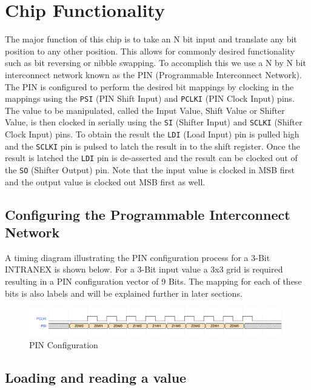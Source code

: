 \documentclass{article}
\begin{document}
\newpage
\section{Chip Functionality}

The major function of this chip is to take an N bit input and translate any bit
position to any other position. This allows for commonly desired functionality
such as bit reversing or nibble swapping. To accomplish this we use a N by N
bit interconnect network known as the PIN (Programmable Interconnect Network).
The PIN is configured to perform the desired bit mappings by clocking in the
mappings using the \texttt{PSI} (PIN Shift Input) and \texttt{PCLKI} (PIN Clock
Input) pins.  The value to be manipulated, called  the Input Value, Shift Value
or Shifter Value, is then clocked in serially using the \texttt{SI} (Shifter
Input) and \texttt{SCLKI} (Shifter Clock Input) pins. To obtain the result the
\texttt{LDI} (Load Input) pin is pulled high and the \texttt{SCLKI} pin is
pulsed to latch the result in to the shift register. Once the result is latched
the \texttt{LDI} pin is de-asserted and the result can be clocked out of the
\texttt{SO} (Shifter Output) pin. Note that the input value is clocked in MSB
first and the output value is clocked out MSB first as well.

\subsection{Configuring the Programmable Interconnect Network}

A timing diagram illustrating the PIN configuration process for a 3-Bit
INTRANEX is shown below. For a 3-Bit input value a 3x3 grid is required
resulting in a PIN configuration vector of 9 Bits. The mapping for each of
these bits is also labels and will be explained further in later sections.

\begin{figure}[H]
    \centering
    \includegraphics[width=\linewidth]{../waveforms/pin.png}
    \caption{PIN Configuration}
\end{figure}

\subsection{Loading and reading a value}
\end{document}
